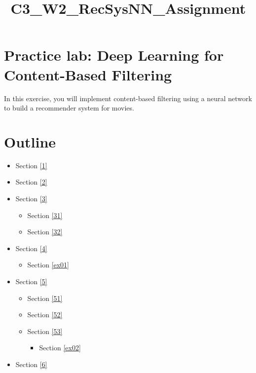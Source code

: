 \documentclass[11pt]{article}
\title{C3\_W2\_RecSysNN\_Assignment}
\providecommand{\tightlist}{%
      \setlength{\itemsep}{0pt}\setlength{\parskip}{0pt}}
\begin{document}
    
    \maketitle
    
    

    
    \hypertarget{practice-lab-deep-learning-for-content-based-filtering}{%
\section{\texorpdfstring{ Practice lab: Deep Learning for Content-Based
Filtering}{ Practice lab: Deep Learning for Content-Based Filtering}}\label{practice-lab-deep-learning-for-content-based-filtering}}

In this exercise, you will implement content-based filtering using a
neural network to build a recommender system for movies.

\hypertarget{outline}{%
\section{Outline}\label{outline}}

\begin{itemize}
\tightlist
\item
  Section \ref{1}
\item
  Section \ref{2}
\item
  Section \ref{3}

  \begin{itemize}
  \tightlist
  \item
    Section \ref{31}
  \item
    Section \ref{32}
  \end{itemize}
\item
  Section \ref{4}

  \begin{itemize}
  \tightlist
  \item
    Section \ref{ex01}
  \end{itemize}
\item
  Section \ref{5}

  \begin{itemize}
  \tightlist
  \item
    Section \ref{51}
  \item
    Section \ref{52}
  \item
    Section \ref{53}

    \begin{itemize}
    \tightlist
    \item
      Section \ref{ex02}
    \end{itemize}
  \end{itemize}
\item
  Section \ref{6}
\end{itemize}
\end{document}
